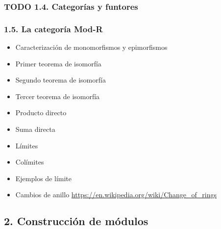 \documentclass[11pt]{article}
\begin{document}
\subsubsection*{{\bfseries\sffamily TODO} 1.4. Categorías y funtores}
\label{sec-7-1-4}
\subsubsection*{1.5. La categoría Mod-R}
\label{sec-7-1-5}
\begin{itemize}
\item Caracterización de monomorfismos y epimorfismos
\label{sec-7-1-5-1}
\item Primer teorema de isomorfía
\label{sec-7-1-5-2}
\item Segundo teorema de isomorfía
\label{sec-7-1-5-3}
\item Tercer teorema de isomorfía
\label{sec-7-1-5-4}
\item Producto directo
\label{sec-7-1-5-5}
\item Suma directa
\label{sec-7-1-5-6}
\item Límites
\label{sec-7-1-5-7}
\item Colímites
\label{sec-7-1-5-8}
\item Ejemplos de límite
\label{sec-7-1-5-9}
\item Cambios de anillo
\label{sec-7-1-5-10}
\url{https://en.wikipedia.org/wiki/Change_of_rings}
\end{itemize}
\subsection*{2. Construcción de módulos}
\label{sec-7-2}
\end{document}
